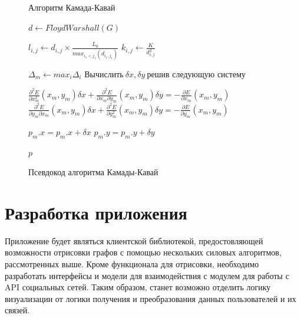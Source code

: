 \documentclass[14pt, russian]{scrartcl}
\begin{document}
\begin{figure}[H]
	\centering
	\begin{minipage}[t]{.9\textwidth}
		\centering
		\begin{algorithm}[H]
			\caption{Алгоритм Камада-Кавай}
			\begin{algorithmic}

				\State $d \gets FloydWarshall(G)$

				\State {}
				\State $l_{i,j} \gets d_{i, j} \times \frac{L_0}{max_{i_1 < j_1}(d_{i_1, j_1})} $
				\State $k_{i,j} \gets \frac{K}{d^{2}_{i, j}} $

				\EndIf


				\EndFor
				\EndFor

				\State {}

				\State $\Delta_m \gets max_i \Delta_i$
				\State $\text{Вычислить} \ \delta x, \delta y \ \text{решив следующую систему}$

				\State $ \frac{\partial^2 E}{\partial x^{2}_m}(x_m, y_m)\delta x + \frac{\partial^2 E}{\partial x_m \partial y_m}(x_m, y_m)\delta y = -\frac{\partial E}{\partial x_m}(x_m, y_m) $
				\State $ \frac{\partial^2 E}{\partial y_m \partial x_m}(x_m, y_m)\delta x + \frac{\partial^2 E}{\partial y^{2}_m}(x_m, y_m)\delta y = -\frac{\partial E}{\partial y_m}(x_m, y_m) $

				\State $p_m.x = p_m.x + \delta x$
				\State $p_m.y = p_m.y + \delta y$
				\EndWhile
				\EndWhile

				\State \Return $p$
				\EndFunction

			\end{algorithmic}
		\end{algorithm}

	\end{minipage}
	\caption{Псевдокод алгоритма Камады-Кавай}
	\label{fig:kk_alg}
\end{figure}





\section{Разработка приложения}


Приложение будет являться клиентской библиотекой,
предостовляющей возможности отрисовки графов с помощью нескольких силовых алгоритмов, рассмотренных выше.
Кроме функционала для отрисовки, необходимо разработать интерфейсы и модели
для взаимодействия с модулем для работы с API социальных сетей.
Таким образом, станет возможно отделить логику визуализации от логики получения и преобразования данных пользователей и их связей.
\end{document}
